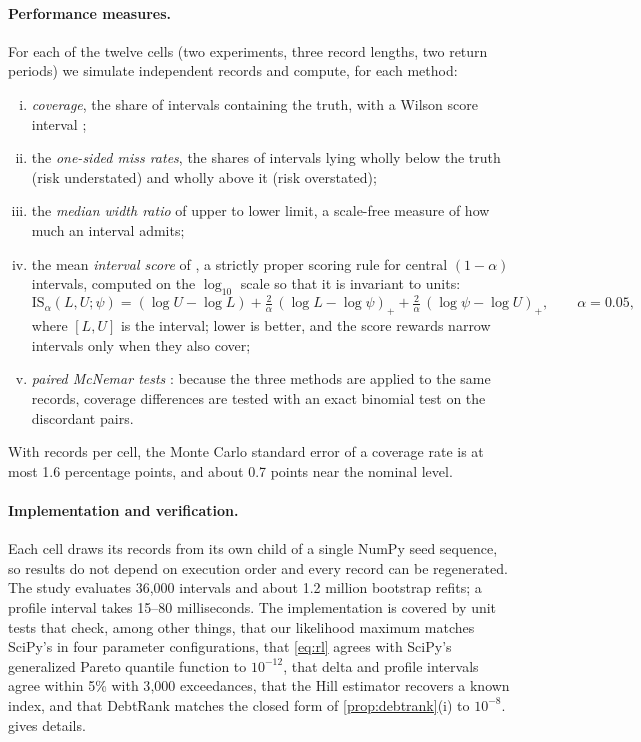 \paragraph{Performance measures.} For each of the twelve cells (two experiments, three record lengths, two return periods) we simulate \Reps{} independent records and compute, for each method:
\begin{enumerate}[(i)]
\item \emph{coverage}, the share of intervals containing the truth, with a Wilson score interval \citep{wilson1927};
\item the \emph{one-sided miss rates}, the shares of intervals lying wholly below the truth (risk understated) and wholly above it (risk overstated);
\item the \emph{median width ratio} of upper to lower limit, a scale-free measure of how much an interval admits;
\item the mean \emph{interval score} of \citet{gneiting2007}, a strictly proper scoring rule for central $(1-\alpha)$ intervals, computed on the $\log_{10}$ scale so that it is invariant to units:
\begin{equation}\label{eq:score}
\mathrm{IS}_\alpha(L,U;\psi) = (\log U - \log L) + \tfrac{2}{\alpha}\,(\log L - \log\psi)_+ + \tfrac{2}{\alpha}\,(\log\psi - \log U)_+ ,\qquad \alpha = 0.05,
\end{equation}
where $[L, U]$ is the interval; lower is better, and the score rewards narrow intervals only when they also cover;
\item \emph{paired McNemar tests} \citep{mcnemar1947}: because the three methods are applied to the same records, coverage differences are tested with an exact binomial test on the discordant pairs.
\end{enumerate}
With \Reps{} records per cell, the Monte Carlo standard error of a coverage rate is at most 1.6 percentage points, and about 0.7 points near the nominal level.

\paragraph{Implementation and verification.} Each cell draws its records from its own child of a single NumPy seed sequence, so results do not depend on execution order and every record can be regenerated. The study evaluates 36{,}000 intervals and about 1.2 million bootstrap refits; a profile interval takes 15--80 milliseconds. The implementation is covered by unit tests that check, among other things, that our likelihood maximum matches SciPy's in four parameter configurations, that \cref{eq:rl} agrees with SciPy's generalized Pareto quantile function to $10^{-12}$, that delta and profile intervals agree within 5\% with 3{,}000 exceedances, that the Hill estimator recovers a known index, and that DebtRank matches the closed form of \cref{prop:debtrank}(i) to $10^{-8}$.  gives details.
